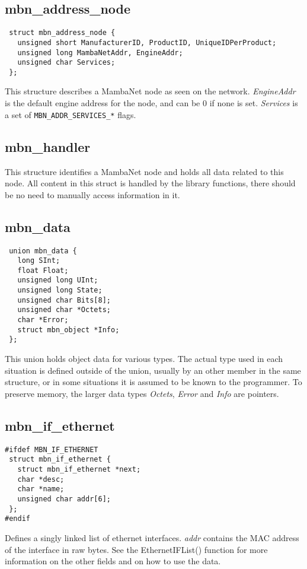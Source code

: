 \subsection{mbn\_address\_node}
\begin{verbatim}
 struct mbn_address_node {
   unsigned short ManufacturerID, ProductID, UniqueIDPerProduct;
   unsigned long MambaNetAddr, EngineAddr;
   unsigned char Services;
 };
\end{verbatim}
This structure describes a MambaNet node as seen on the network. \textit{EngineAddr} is the default engine address for the node, and can be 0 if none is set. \textit{Services} is a set of \verb|MBN_ADDR_SERVICES_*| flags.


\subsection{mbn\_handler}
This structure identifies a MambaNet node and holds all data related to this node. All content in this struct is handled by the library functions, there should be no need to manually access information in it.


\subsection{mbn\_data}
\begin{verbatim}
 union mbn_data {
   long SInt;
   float Float;
   unsigned long UInt;
   unsigned long State;
   unsigned char Bits[8];
   unsigned char *Octets;
   char *Error;
   struct mbn_object *Info;
 };
\end{verbatim}
This union holds object data for various types. The actual type used in each situation is defined outside of the union, usually by an other member in the same structure, or in some situations it is assumed to be known to the programmer. To preserve memory, the larger data types \textit{Octets}, \textit{Error} and \textit{Info} are pointers.


\subsection{mbn\_if\_ethernet}
\begin{verbatim}
#ifdef MBN_IF_ETHERNET
 struct mbn_if_ethernet {
   struct mbn_if_ethernet *next;
   char *desc;
   char *name;
   unsigned char addr[6];
 };
#endif
\end{verbatim}
Defines a singly linked list of ethernet interfaces. \textit{addr} contains the MAC address of the interface in raw bytes. See the EthernetIFList() function for more information on the other fields and on how to use the data.


